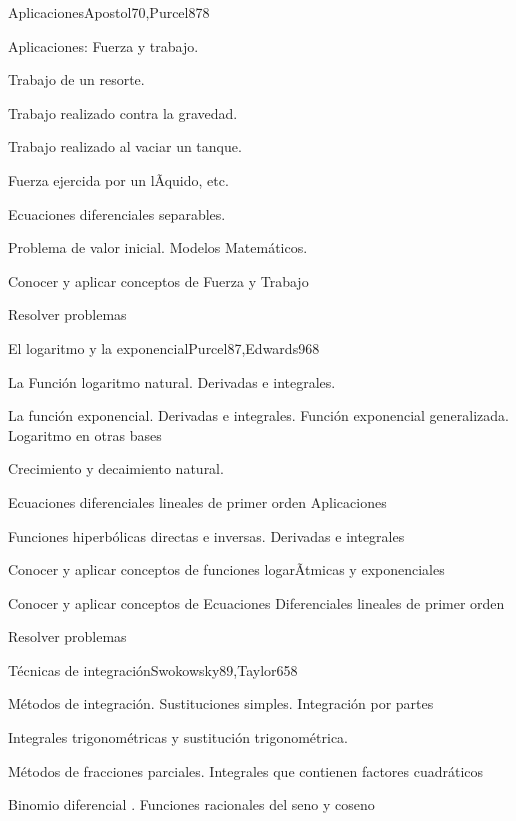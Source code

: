 \begin{syllabus}
\begin{unit}{Aplicaciones}{Apostol70,Purcel87}{8}
\begin{topics}
      \item Aplicaciones: Fuerza y trabajo. 
      \item Trabajo de un resorte. 
      \item Trabajo realizado contra la gravedad. 
      \item Trabajo realizado al vaciar un tanque. 
      \item Fuerza ejercida por un lÃ­quido, etc.
      \item Ecuaciones diferenciales separables. 
      \item Problema de valor inicial. Modelos Matemáticos.
\end{topics}

\begin{unitgoals}
	\item Conocer y aplicar conceptos de Fuerza y Trabajo
	\item Resolver problemas
\end{unitgoals}
\end{unit}

\begin{unit}{El logaritmo y la exponencial}{Purcel87,Edwards96}{8}
\begin{topics}
	\item La Función logaritmo natural. Derivadas e integrales.
	\item La función exponencial. Derivadas e integrales. Función exponencial  generalizada. Logaritmo en otras bases
	\item Crecimiento y decaimiento natural. 
	\item Ecuaciones diferenciales lineales de primer orden Aplicaciones
	\item Funciones hiperbólicas directas e inversas. Derivadas e integrales
\end{topics}

\begin{unitgoals}
	\item Conocer y aplicar conceptos de funciones logarÃ­tmicas y exponenciales
	\item Conocer y aplicar conceptos de Ecuaciones Diferenciales lineales de primer orden
	\item Resolver problemas
\end{unitgoals}
\end{unit}

\begin{unit}{Técnicas de integración}{Swokowsky89,Taylor65}{8}
\begin{topics}
	\item Métodos de integración. Sustituciones simples. Integración por partes
	\item Integrales trigonométricas y sustitución trigonométrica.
	\item Métodos de fracciones parciales. Integrales que contienen factores  cuadráticos
	\item Binomio diferencial . Funciones racionales del seno y coseno
\end{topics}


\end{unit}
\end{syllabus}
